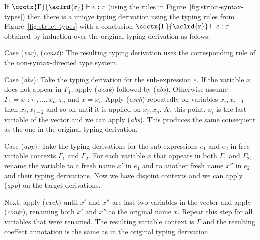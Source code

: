 \begin{remark}
\label{thm:flat-impl-admis}
  If $\coctx{\Gamma}{\aclrd{\textbf{r}}} \vdash e : \tau$ (using the rules in
  Figure~\ref{fig:struct-syntax-types}) then there is a uniqye typing derivation
  using the typing rules from Figure~\ref{fig:struct-types} with a conclusion
  $\coctx{\Gamma}{\aclrd{\textbf{r}}} \vdash e : \tau$ obtained by induction over
  the original typing derivation as folows:

\vspace{0.5em}\noindent\hangindent=0.6cm
Case (\emph{var}), (\emph{const}): The resulting typing derivation uses the corresponding
  rule of the non-syntax-directed type system.

\vspace{0.5em}\noindent\hangindent=0.6cm
Case (\emph{abs}): Take the typing derivation for the sub-expression $e$. If the variable $x$
  does not appear in $\Gamma_1$, apply (\emph{weak}) followed by (\emph{abs}). Otherwise
  assume $\Gamma_1 = x_1\!:\!\tau_1,\ldots,x_n\!:\!\tau_n$ and $x=x_i$. Apply (\emph{exch})
  repeatedly on variables $x_i, x_{i+1}$ then $x_i, x_{i+2}$ and so on until it is applied
  on $x_i, x_n$. At this point, $x_i$ is the last variable of the vector and we can apply
  (\emph{abs}). This produces the same consequent as the one in the original typing derivation.

\vspace{0.5em}\noindent\hangindent=0.6cm
Case (\emph{app}): Take the typing derivations for the sub-expressions $e_1$ and $e_2$ in
  free-variable contexts $\Gamma_1$ and $\Gamma_2$. For each variable $x$ that appears in both
  $\Gamma_1$ and $\Gamma_2$, rename the variable to a fresh name $x'$ in $e_1$ and to another
  fresh name $x''$ in $e_2$ and their typing derivations. Now we have disjoint contexts and
  we can apply (\emph{app}) on the target derivations.

\vspace{0.5em}\noindent\hspace{0.6cm}\hangindent=0.6cm
  Next, apply (\emph{exch}) until $x'$ and $x''$ are last two variables in the vector and apply
  (\emph{contr}), renaming both $x'$ and $x''$ to the original name $x$. Repeat this step for
  all variables that were renamed. The resulting variable context is $\Gamma$ and the resulting
  coeffect annotation is the same as in the original typing derivation.
\end{remark}


